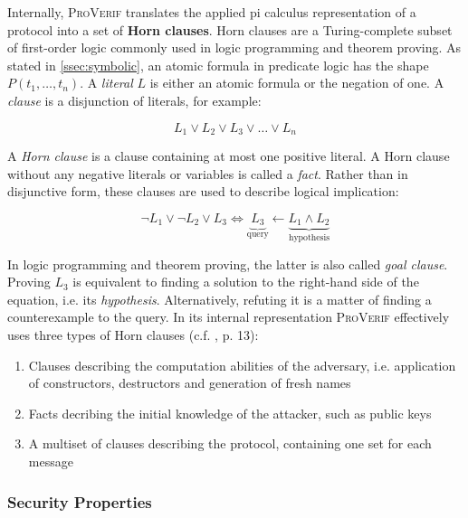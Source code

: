 Internally, \textsc{ProVerif} translates the applied pi calculus representation of a protocol into a set of \textbf{Horn clauses}.
Horn clauses are a Turing-complete subset of first-order logic commonly used in logic programming and theorem proving.
As stated in \ref{ssec:symbolic}, an atomic formula in predicate logic has the shape $P(t_1, \ldots, t_n)$.
A \textit{literal} $L$ is either an atomic formula or the negation of one.
A \textit{clause} is a disjunction of literals, for example:

\begin{equation}
    L_1 \vee L_2 \vee L_3 \vee \ldots \vee L_n
\end{equation}

\noindent
A \textit{Horn clause} is a clause containing at most one positive literal.
A Horn clause without any negative literals or variables is called a \textit{fact}.
Rather than in disjunctive form, these clauses are used to describe logical implication:

\begin{equation}
    \label{eq:implication}
    \lnot L_1 \vee \lnot L_2 \vee L_3 \Leftrightarrow  \underbrace{L_3}_\text{query} \leftarrow \underbrace{L_1 \wedge L_2}_\text{hypothesis}
\end{equation}

In logic programming and theorem proving, the latter is also called \textit{goal clause}.
Proving $L_3$ is equivalent to finding a solution to the right-hand side of the equation, i.e. its \textit{hypothesis}.
Alternatively, refuting it is a matter of finding a counterexample to the query.
In its internal representation \textsc{ProVerif} effectively uses three types of Horn clauses (c.f. \cite{blanchet2013automatic}, p. 13):

\begin{enumerate}[label=--]
    \item Clauses describing the computation abilities of the adversary, i.e. application of constructors, destructors and generation of fresh names
    \item Facts decribing the initial knowledge of the attacker, such as public keys
    \item A multiset of clauses describing the protocol, containing one set for each message
\end{enumerate}

\subsubsection{Security Properties}

